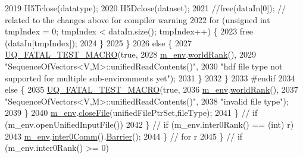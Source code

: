 \begin{DoxyCode}
2019               H5Tclose(datatype);
2020               H5Dclose(dataset);
2021               \textcolor{comment}{//free(dataIn[0]); // related to the changes above for compiler warning}
2022               \textcolor{keywordflow}{for} (\textcolor{keywordtype}{unsigned} \textcolor{keywordtype}{int} tmpIndex = 0; tmpIndex < dataIn.size(); tmpIndex++) \{
2023                 free (dataIn[tmpIndex]);
2024               \}
2025             \}
2026             \textcolor{keywordflow}{else} \{
2027               \hyperlink{_defines_8h_a56d63d18d0a6d45757de47fcc06f574d}{UQ\_FATAL\_TEST\_MACRO}(\textcolor{keyword}{true},
2028                                   \hyperlink{class_q_u_e_s_o_1_1_base_vector_sequence_a8e8824d2a63c5a43bcc6473e3a0491e8}{m\_env}.\hyperlink{class_q_u_e_s_o_1_1_base_environment_a78b57112bbd0e6dd0e8afec00b40ffa7}{worldRank}(),
2029                                   \textcolor{stringliteral}{"SequenceOfVectors<V,M>::unifiedReadContents()"},
2030                                   \textcolor{stringliteral}{"hdf file type not supported for multiple sub-environments yet"});
2031             \}
2032           \}
2033 \textcolor{preprocessor}{#endif}
2034 \textcolor{preprocessor}{}          \textcolor{keywordflow}{else} \{
2035             \hyperlink{_defines_8h_a56d63d18d0a6d45757de47fcc06f574d}{UQ\_FATAL\_TEST\_MACRO}(\textcolor{keyword}{true},
2036                                 \hyperlink{class_q_u_e_s_o_1_1_base_vector_sequence_a8e8824d2a63c5a43bcc6473e3a0491e8}{m\_env}.\hyperlink{class_q_u_e_s_o_1_1_base_environment_a78b57112bbd0e6dd0e8afec00b40ffa7}{worldRank}(),
2037                                 \textcolor{stringliteral}{"SequenceOfVectors<V,M>::unifiedReadContents()"},
2038                                 \textcolor{stringliteral}{"invalid file type"});
2039           \}
2040           \hyperlink{class_q_u_e_s_o_1_1_base_vector_sequence_a8e8824d2a63c5a43bcc6473e3a0491e8}{m\_env}.\hyperlink{class_q_u_e_s_o_1_1_base_environment_ab712bff194ddd91459d4ea8715c77e8b}{closeFile}(unifiedFilePtrSet,fileType);
2041         \} \textcolor{comment}{// if (m\_env.openUnifiedInputFile())}
2042       \} \textcolor{comment}{// if (m\_env.inter0Rank() == (int) r)}
2043       \hyperlink{class_q_u_e_s_o_1_1_base_vector_sequence_a8e8824d2a63c5a43bcc6473e3a0491e8}{m\_env}.\hyperlink{class_q_u_e_s_o_1_1_base_environment_a689e4d140c74d495d97eb498714a4b82}{inter0Comm}().\hyperlink{class_q_u_e_s_o_1_1_mpi_comm_a4059971c30e023b272fccaa6aa00c426}{Barrier}();
2044     \} \textcolor{comment}{// for r}
2045   \} \textcolor{comment}{// if (m\_env.inter0Rank() >= 0)}

\end{DoxyCode}
